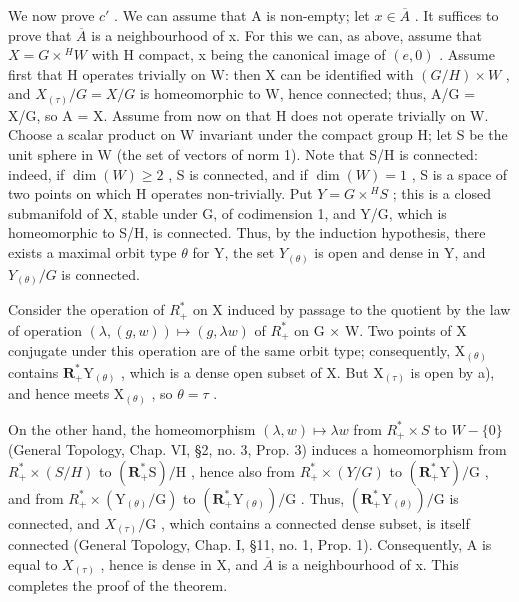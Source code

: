 We now prove \(c'\) . We can assume that A is non-empty; let \(x \in \overline{A}\) . It suffices to prove that \(\overline{A}\) is a neighbourhood of x. For this we can, as above, assume that \(X = G \times {}^{H}W\) with H compact, x being the canonical image of \((e,0)\) . Assume first that H operates trivially on W: then X can be identified with \((G/H) \times W\) , and \(X_{(\tau)}/G = X/G\) is homeomorphic to W, hence connected; thus, A/G = X/G, so A = X. Assume from now on that H does not operate trivially on W. Choose a scalar product on W invariant under the compact group H; let S be the unit sphere in W (the set of vectors of norm 1). Note that S/H is connected: indeed, if \(\dim(W) \geq 2\) , S is connected, and if \(\dim(W) = 1\) , S is a space of two points on which H operates non-trivially. Put \(Y = G \times {}^{H}S\) ; this is a closed submanifold of X, stable under G, of codimension 1, and Y/G, which is homeomorphic to S/H, is connected. Thus, by the induction hypothesis, there exists a maximal orbit type \(\theta\) for Y, the set \(Y_{(\theta)}\) is open and dense in Y, and \(Y_{(\theta)}/G\) is connected.

Consider the operation of \(R_{+}^{*}\) on X induced by passage to the quotient by the law of operation \((\lambda, (g, w)) \mapsto (g, \lambda w)\) of \(R_{+}^{*}\) on G × W. Two points of X conjugate under this operation are of the same orbit type; consequently, \(\mathrm{X}_{(\theta)}\) contains \(\mathbf{R}_{+}^{*}\mathrm{Y}_{(\theta)}\) , which is a dense open subset of X. But \(\mathrm{X}_{(\tau)}\) is open by a), and hence meets \(\mathrm{X}_{(\theta)}\) , so \(\theta = \tau\) .

On the other hand, the homeomorphism \((\lambda,w)\mapsto\lambda w\) from \(R_{+}^{*}\times S\) to \(W-\{0\}\) (General Topology, Chap. VI, §2, no. 3, Prop. 3) induces a homeomorphism from \(R_{+}^{*}\times(S/H)\) to \((\mathbf{R}_{+}^{*}\mathrm{S})/\mathrm{H}\) , hence also from \(R_{+}^{*}\times(Y/G)\) to \((\mathbf{R}_{+}^{*}\mathrm{Y})/\mathrm{G}\) , and from \(R_{+}^{*}\times(\mathrm{Y}_{(\theta)}/\mathrm{G})\) to \((\mathbf{R}_{+}^{*}\mathrm{Y}_{(\theta)})/\mathrm{G}\) . Thus, \((\mathbf{R}_{+}^{*}\mathrm{Y}_{(\theta)})/\mathrm{G}\) is connected, and \(X_{(\tau)}/\mathrm{G}\) , which contains a connected dense subset, is itself connected (General Topology, Chap. I, §11, no. 1, Prop. 1). Consequently, A is equal to \(X_{(\tau)}\) , hence is dense in X, and \(\overline{A}\) is a neighbourhood of x. This completes the proof of the theorem.

